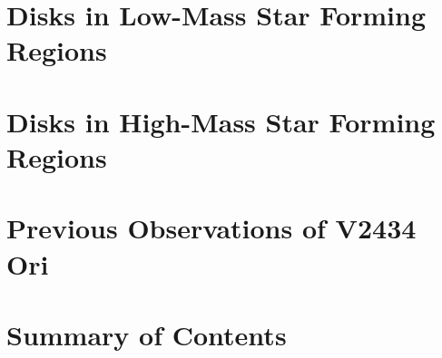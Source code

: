 \section{Disks in Low-Mass Star Forming Regions}
\section{Disks in High-Mass Star Forming Regions}

\section{Previous Observations of V2434 Ori}

\section{Summary of Contents}























